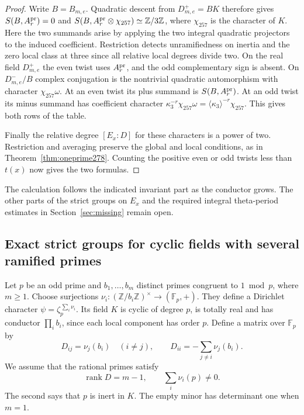 \documentclass[a4paper,11pt]{article}
\theoremstyle{definition}
\theoremstyle{remark}
\newcommand{\ZZ}{\mathbb Z}\newcommand{\ord}{\operatorname{ord}}
\numberwithin{equation}{section}
\begin{document}
\begin{proof}
Write \(B=B_{m,e}\). Quadratic descent from \(D_{m,e}^+=BK\)
therefore gives \(S(B,A_r^{\rm pr})=0\) and
\(S(B,A_r^{\rm pr}\otimes\chi_{257})\simeq\ZZ/3\ZZ\),
where \(\chi_{257}\) is the character of \(K\). Here the
two summands arise by applying the two integral quadratic
projectors to the induced coefficient. Restriction detects
unramifiedness on inertia and the zero local class at three
since all relative local degrees divide two.
On the real field \(D_{m,e}^+\) the even twist uses
\(A_r^{\rm pr}\), and the odd complementary sign is absent.
On \(D_{m,e}^-/B\) complex conjugation is the nontrivial
quadratic automorphism with character \(\chi_{257}\omega\).
At an even twist its plus summand is \(S(B,A_r^{\rm pr})\).
At an odd twist its minus summand has coefficient character
\(\kappa_3^{-r}\chi_{257}\omega
   =\langle\kappa_3\rangle^{-r}\chi_{257}\).
This gives both rows of the table.

Finally the relative degree \([E_x:D]\) for these characters
is a power of two. Restriction and averaging preserve the
global and local conditions, as in Theorem~\ref{thm:oneprime278}.
Counting the positive even or odd twists less than \(t(x)\)
now gives the two formulas.
\end{proof}

The calculation follows the indicated invariant part as the
conductor grows. The other parts of the strict groups on \(E_x\)
and the required integral theta-period estimates in Section~\ref{sec:missing}
remain open.


\subsection{Exact strict groups for cyclic fields with several ramified primes}
\label{sec:cyclicray657}

Let \(p\) be an odd prime and \(b_1,\ldots,b_m\) distinct primes
congruent to \(1\bmod p\), where \(m\ge1\). Choose surjections
\(\nu_i:(\ZZ/b_i\ZZ)^\times\to(\mathbb F_p,+)\). They define a
Dirichlet character \(\psi=\zeta_p^{\,\sum_i\nu_i}\). Its field
\(K\) is cyclic of degree \(p\), is totally real and has conductor
\(\prod_i b_i\), since each local component has order \(p\).
Define a matrix over \(\mathbb F_p\) by
\[
       D_{ij}=\nu_j(b_i)\quad(i\ne j),\qquad
       D_{ii}=-\sum_{j\ne i}\nu_j(b_i).
\]
We assume that the rational primes satisfy
\[
          \operatorname{rank}D=m-1,\qquad \sum_i\nu_i(p)\ne0.
\]
The second says that \(p\) is inert in \(K\). The empty minor
has determinant one when \(m=1\).
\end{document}
